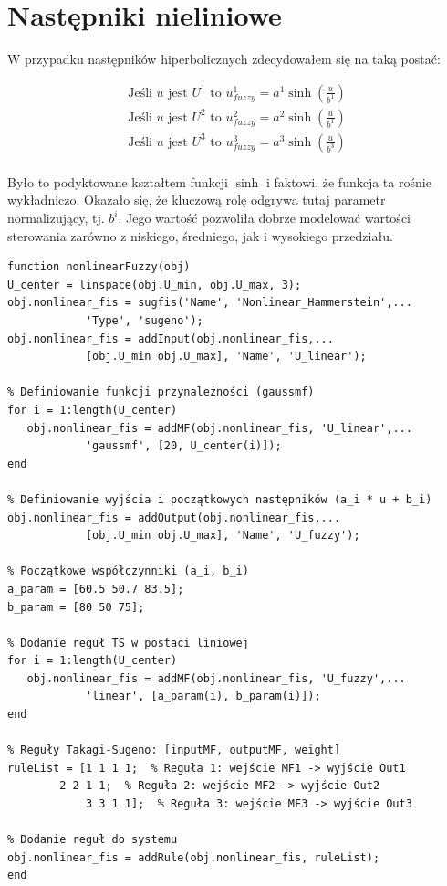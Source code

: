 \newpage

\section{Następniki nieliniowe}
W przypadku następników hiperbolicznych zdecydowałem się na taką postać:

\begin{equation}
\begin{array}{c}
\text{Jeśli } u \text{ jest } U^1 \text{ to } u^1_{fuzzy}=a^1\sinh \left({\frac{u}{b^1}}\right) \\
\text{Jeśli } u \text{ jest } U^2 \text{ to } u^2_{fuzzy}=a^2\sinh \left({\frac{u}{b^1}}\right) \\
\text{Jeśli } u \text{ jest } U^3 \text{ to } u^3_{fuzzy}=a^3\sinh \left({\frac{u}{b^3}}\right) \\
\end{array}
\end{equation}

\noindent Było to podyktowane kształtem funkcji $\sinh$ i faktowi, że funkcja ta rośnie wykładniczo. Okazało się, że kluczową rolę odgrywa tutaj parametr normalizujący, tj. $b^i$. Jego wartość pozwoliła dobrze modelować wartości sterowania zarówno z niskiego, średniego, jak i wysokiego przedziału. 

\begin{lstlisting}[style=Matlab-editor]
function nonlinearFuzzy(obj)
U_center = linspace(obj.U_min, obj.U_max, 3);
obj.nonlinear_fis = sugfis('Name', 'Nonlinear_Hammerstein',...
			'Type', 'sugeno');
obj.nonlinear_fis = addInput(obj.nonlinear_fis,...
			[obj.U_min obj.U_max], 'Name', 'U_linear');
            
% Definiowanie funkcji przynależności (gaussmf)
for i = 1:length(U_center)
   obj.nonlinear_fis = addMF(obj.nonlinear_fis, 'U_linear',...
			'gaussmf', [20, U_center(i)]);
end
            
% Definiowanie wyjścia i początkowych następników (a_i * u + b_i)
obj.nonlinear_fis = addOutput(obj.nonlinear_fis,...
			[obj.U_min obj.U_max], 'Name', 'U_fuzzy');

% Początkowe współczynniki (a_i, b_i)
a_param = [60.5 50.7 83.5];
b_param = [80 50 75];
            
% Dodanie reguł TS w postaci liniowej
for i = 1:length(U_center)
   obj.nonlinear_fis = addMF(obj.nonlinear_fis, 'U_fuzzy',...
			'linear', [a_param(i), b_param(i)]);
end
            
% Reguły Takagi-Sugeno: [inputMF, outputMF, weight]
ruleList = [1 1 1 1;  % Reguła 1: wejście MF1 -> wyjście Out1
	    2 2 1 1;  % Reguła 2: wejście MF2 -> wyjście Out2
            3 3 1 1];  % Reguła 3: wejście MF3 -> wyjście Out3
            
% Dodanie reguł do systemu
obj.nonlinear_fis = addRule(obj.nonlinear_fis, ruleList);
end
\end{lstlisting}

